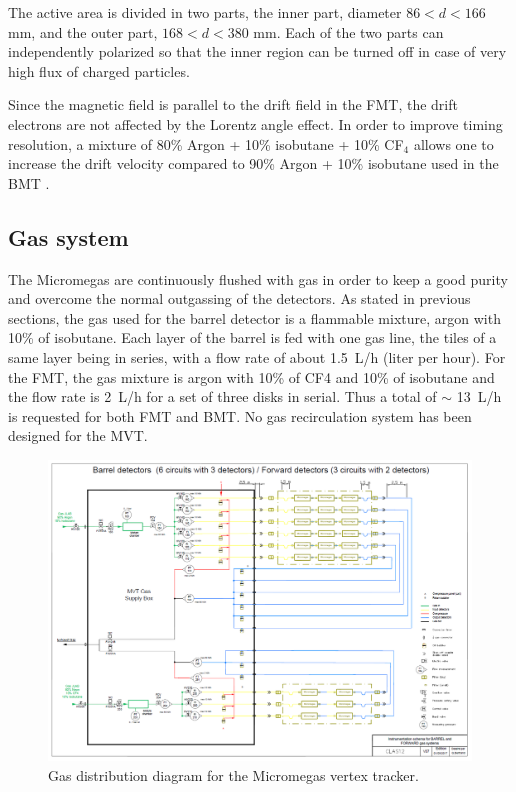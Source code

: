 The active area is divided in two parts, the inner part,  diameter  $86 < d < 166$ mm, and the outer part, $168 < d < 380$ mm. Each of the two parts can independently polarized so that the inner region can be turned off in case of very high flux of charged particles.

Since the magnetic field is parallel to the drift field in the FMT, the drift electrons are not affected by the Lorentz angle effect. In order to improve timing resolution, a mixture of 80\% Argon + 10\% isobutane + 10\% CF$_4$ allows one to increase the drift velocity compared to 90\% Argon + 10\% isobutane used in the BMT \cite{GAS}. 


\subsection{Gas system}
The Micromegas are continuously flushed with gas in order to keep a good purity and overcome the normal outgassing of the detectors. As stated in previous sections, the gas used for the barrel detector is a flammable mixture, argon with 10\% of isobutane. Each layer of the barrel is fed with one gas line, the tiles of a same layer being in series, with a flow rate of about 1.5~L/h (liter per hour). For the FMT, the gas mixture is argon with 10\% of CF4 and 10\% of isobutane and the flow rate is 2~L/h for a set of three disks in serial. Thus a total of $\sim$ 13~L/h is requested for both FMT and BMT. No gas recirculation system has been designed for the MVT. 

\begin{figure}[htb]
\includegraphics[width=2\columnwidth,keepaspectratio]{images/gas_system}
 \caption{Gas distribution diagram for the Micromegas vertex tracker.}
 \label{fig:mm-gas-sys}
\end{figure}

